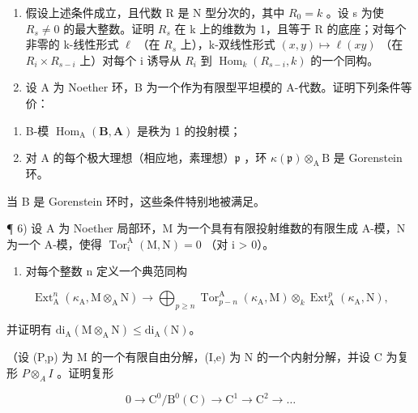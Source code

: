 \begin{enumerate}
\def\labelenumi{\alph{enumi})}
\setcounter{enumi}{1}
\item
  假设上述条件成立，且代数 R 是 N 型分次的，其中 \(R_{0} = k\) 。设 s 为使 \(R_{s} \neq 0\) 的最大整数。证明 \(R_{s}\) 在 k 上的维数为 1，且等于 R 的底座；对每个非零的 k-线性形式 \(\ell\) （在 \(R_{s}\) 上），k-双线性形式 \((x, y) \mapsto \ell(xy)\) （在 \(R_{i} \times R_{s- i}\) 上）对每个 i 诱导从 \(R_{i}\) 到 \(\operatorname{Hom}_{k}(R_{s-i}, k)\) 的一个同构。
\item
  设 A 为 Noether 环，B 为一个作为有限型平坦模的 A-代数。证明下列条件等价：
\end{enumerate}

\begin{enumerate}
\def\labelenumi{(\roman{enumi})}
\item
  B-模 \(\operatorname{Hom}_{\mathrm{A}}(\mathbf{B},\mathbf{A})\) 是秩为 1 的投射模；
\item
  对 A 的每个极大理想（相应地，素理想）\(\mathfrak{p}\) ，环 \(\kappa(\mathfrak{p})\otimes_{\mathrm{A}}\mathrm{B}\) 是 Gorenstein 环。
\end{enumerate}

当 B 是 Gorenstein 环时，这些条件特别地被满足。

¶ 6) 设 A 为 Noether 局部环，M 为一个具有有限投射维数的有限生成 A-模，N 为一个 A-模，使得 \(\operatorname{Tor}_{i}^{\mathrm{A}}(\mathrm{M},\mathrm{N}) = 0\) （对 i \textgreater{} 0）。

\begin{enumerate}
\def\labelenumi{\alph{enumi})}
\tightlist
\item
  对每个整数 n 定义一个典范同构
\end{enumerate}

\[
\operatorname{Ext} _ {\mathrm{A}} ^ {n} (\kappa_ {\mathrm{A}}, \mathrm{M} \otimes_ {\mathrm{A}} \mathrm{N}) \longrightarrow \bigoplus_ {p \geqslant n} \operatorname{Tor} _ {p - n} ^ {\mathrm{A}} (\kappa_ {\mathrm{A}}, \mathrm{M}) \otimes_ {k} \operatorname{Ext} _ {\mathrm{A}} ^ {p} (\kappa_ {\mathrm{A}}, \mathrm{N}),
\]

并证明有 \(\mathrm{di}_{\mathrm{A}}(\mathrm{M}\otimes_{\mathrm{A}}\mathrm{N})\leqslant \mathrm{di}_{\mathrm{A}}(\mathrm{N})\)。

（设 (P,p) 为 M 的一个有限自由分解，(I,e) 为 N 的一个内射分解，并设 C 为复形 \(P \otimes_A I\) 。证明复形

\[
0 \to \mathrm{C} ^ {0} / \mathrm{B} ^ {0} (\mathrm{C}) \to \mathrm{C} ^ {1} \to \mathrm{C} ^ {2} \to \dots
\]

